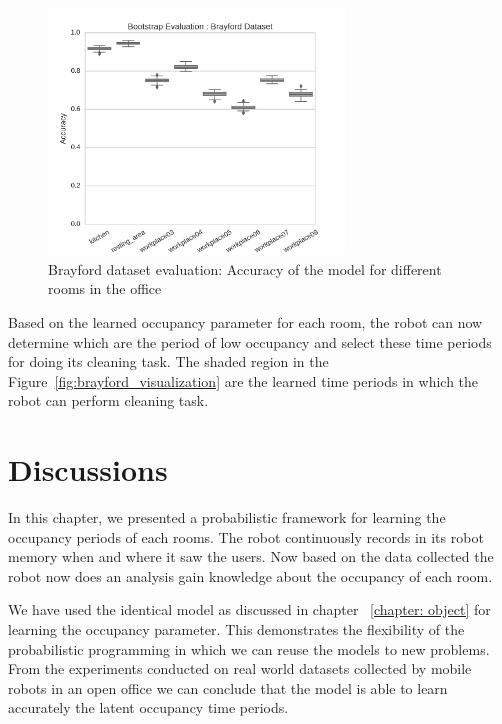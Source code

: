 \begin{figure}[htp]
\centering
\includegraphics[width=0.7\textwidth]{images/Brayford_dataset_results_evaluation.png}
\caption[Brayford Dataset Evaluation]{Brayford dataset evaluation: Accuracy of the model for different rooms in the office}
\label{fig:brayford_evaluation}
\end{figure}



Based on the learned occupancy parameter for each room, the robot can now determine which are the period of low occupancy and select these time periods for doing its cleaning task. The shaded region in the Figure~\ref{fig:brayford_visualization} are the learned time periods in which the robot can perform cleaning task.
\FloatBarrier

\section{Discussions}

In this chapter, we presented a probabilistic framework for learning the occupancy periods of each rooms. The robot continuously records in its robot memory when and where it saw the users. Now based on the data collected the robot now does an analysis gain knowledge about the occupancy of each room. 

We have used the identical model as discussed in chapter ~\ref{chapter: object} for learning the occupancy parameter. This demonstrates the flexibility of the probabilistic programming in which we can reuse the models to new problems.
From the experiments conducted on real world datasets collected by mobile robots in an open office we can conclude that the model is able to learn accurately the latent occupancy time periods. 